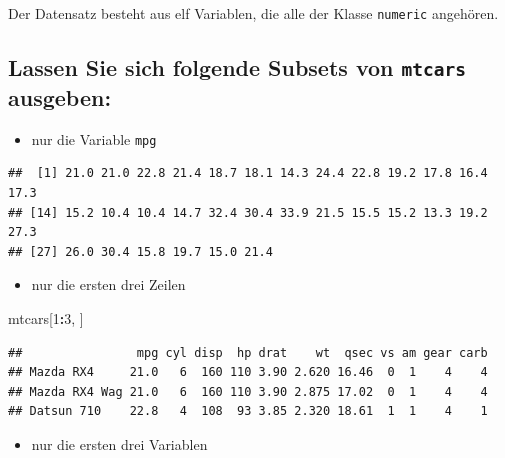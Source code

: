 \documentclass[12pt,a4paper]{article}
\newenvironment{Shaded}{\begin{snugshade}}{\end{snugshade}}
\newcommand{\DecValTok}[1]{\textcolor[rgb]{0.00,0.00,0.81}{#1}}
\newcommand{\NormalTok}[1]{#1}
\newcommand{\SpecialCharTok}[1]{\textcolor[rgb]{0.81,0.36,0.00}{\textbf{#1}}}
\begin{document}
Der Datensatz besteht aus elf Variablen, die alle der Klasse
\texttt{numeric} angehören.

\hypertarget{lassen-sie-sich-folgende-subsets-von-mtcars-ausgeben}{%
\subsection{\texorpdfstring{Lassen Sie sich folgende Subsets von
\texttt{mtcars}
ausgeben:}{Lassen Sie sich folgende Subsets von mtcars ausgeben:}}\label{lassen-sie-sich-folgende-subsets-von-mtcars-ausgeben}}

\begin{itemize}
  \item nur die Variable \texttt{mpg}
\end{itemize}

\begin{Shaded}
\end{Shaded}

\begin{verbatim}
##  [1] 21.0 21.0 22.8 21.4 18.7 18.1 14.3 24.4 22.8 19.2 17.8 16.4 17.3
## [14] 15.2 10.4 10.4 14.7 32.4 30.4 33.9 21.5 15.5 15.2 13.3 19.2 27.3
## [27] 26.0 30.4 15.8 19.7 15.0 21.4
\end{verbatim}

\begin{itemize}
  \item nur die ersten drei Zeilen
\end{itemize}

\begin{Shaded}
\begin{Highlighting}[]
\NormalTok{    mtcars[}\DecValTok{1}\SpecialCharTok{:}\DecValTok{3}\NormalTok{, ]}
\end{Highlighting}
\end{Shaded}

\begin{verbatim}
##                mpg cyl disp  hp drat    wt  qsec vs am gear carb
## Mazda RX4     21.0   6  160 110 3.90 2.620 16.46  0  1    4    4
## Mazda RX4 Wag 21.0   6  160 110 3.90 2.875 17.02  0  1    4    4
## Datsun 710    22.8   4  108  93 3.85 2.320 18.61  1  1    4    1
\end{verbatim}

\begin{itemize}
  \item nur die ersten drei Variablen
\end{itemize}
\end{document}
